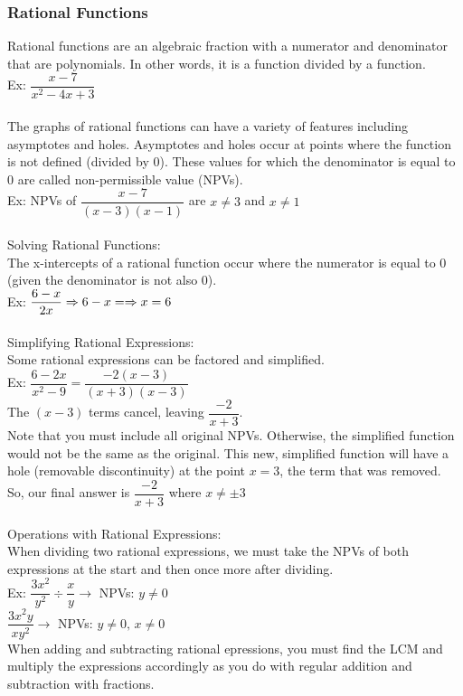 \documentclass[11pt, fleqn]{article}
\begin{document}
\subsubsection{Rational Functions}
Rational functions are an algebraic fraction with a numerator and denominator that are polynomials. In other words, it is a function divided by a function.\\
Ex: $\dfrac{x-7}{x^2-4x+3}$\\
\\
The graphs of rational functions can have a variety of features including asymptotes and holes. Asymptotes and holes occur at points where the function is not defined (divided by 0). These values for which the denominator is equal to 0 are called non-permissible value (NPVs).\\
Ex: NPVs of $\dfrac{x-7}{(x-3)(x-1)}$ are $x\neq3$ and $x\neq 1$\\
\\
Solving Rational Functions:\\
The x-intercepts of a rational function occur where the numerator is equal to 0 (given the denominator is not also 0).\\
Ex: $\dfrac{6-x}{2x}\Rightarrow6-x=\Rightarrow x=6$\\
\\
Simplifying Rational Expressions:\\
Some rational expressions can be factored and simplified.\\
Ex: $\dfrac{6-2x}{x^2-9}=\dfrac{-2(x-3)}{(x+3)(x-3)}$\\
The $(x-3)$ terms cancel, leaving $\dfrac{-2}{x+3}$.\\
Note that you must include all original NPVs. Otherwise, the simplified function would not be the same as the original. This new, simplified function will have a hole (removable discontinuity) at the point $x=3$, the term that was removed.\\
So, our final answer is $\dfrac{-2}{x+3}$ where $x\neq\pm3$\\
\\
Operations with Rational Expressions:\\
When dividing two rational expressions, we must take the NPVs of both expressions at the start and then once more after dividing.\\
Ex: $\dfrac{3x^2}{y^2}\div\dfrac{x}{y}\to$ NPVs: $y\neq0$\\
$\dfrac{3x^2y}{xy^2}\to$ NPVs: $y\neq0,\,x\neq0$\\
When adding and subtracting rational epressions, you must find the LCM and multiply the expressions accordingly as you do with regular addition and subtraction with fractions.\\
\end{document}
